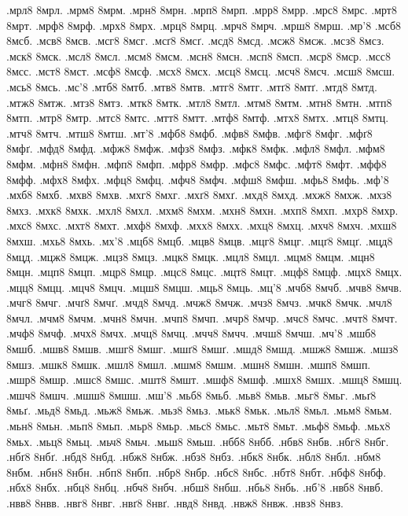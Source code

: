 {.мрл8
8мрл.
.мрм8
8мрм.
.мрн8
8мрн.
.мрп8
8мрп.
.мрр8
8мрр.
.мрс8
8мрс.
.мрт8
8мрт.
.мрф8
8мрф.
.мрх8
8мрх.
.мрц8
8мрц.
.мрч8
8мрч.
.мрш8
8мрш.
.мр'8
.мсб8
8мсб.
.мсв8
8мсв.
.мсг8
8мсг.
.мсґ8
8мсґ.
.мсд8
8мсд.
.мсж8
8мсж.
.мсз8
8мсз.
.мск8
8мск.
.мсл8
8мсл.
.мсм8
8мсм.
.мсн8
8мсн.
.мсп8
8мсп.
.мср8
8мср.
.мсс8
8мсс.
.мст8
8мст.
.мсф8
8мсф.
.мсх8
8мсх.
.мсц8
8мсц.
.мсч8
8мсч.
.мсш8
8мсш.
.мсь8
8мсь.
.мс'8
.мтб8
8мтб.
.мтв8
8мтв.
.мтг8
8мтг.
.мтґ8
8мтґ.
.мтд8
8мтд.
.мтж8
8мтж.
.мтз8
8мтз.
.мтк8
8мтк.
.мтл8
8мтл.
.мтм8
8мтм.
.мтн8
8мтн.
.мтп8
8мтп.
.мтр8
8мтр.
.мтс8
8мтс.
.мтт8
8мтт.
.мтф8
8мтф.
.мтх8
8мтх.
.мтц8
8мтц.
.мтч8
8мтч.
.мтш8
8мтш.
.мт'8
.мфб8
8мфб.
.мфв8
8мфв.
.мфг8
8мфг.
.мфґ8
8мфґ.
.мфд8
8мфд.
.мфж8
8мфж.
.мфз8
8мфз.
.мфк8
8мфк.
.мфл8
8мфл.
.мфм8
8мфм.
.мфн8
8мфн.
.мфп8
8мфп.
.мфр8
8мфр.
.мфс8
8мфс.
.мфт8
8мфт.
.мфф8
8мфф.
.мфх8
8мфх.
.мфц8
8мфц.
.мфч8
8мфч.
.мфш8
8мфш.
.мфь8
8мфь.
.мф'8
.мхб8
8мхб.
.мхв8
8мхв.
.мхг8
8мхг.
.мхґ8
8мхґ.
.мхд8
8мхд.
.мхж8
8мхж.
.мхз8
8мхз.
.мхк8
8мхк.
.мхл8
8мхл.
.мхм8
8мхм.
.мхн8
8мхн.
.мхп8
8мхп.
.мхр8
8мхр.
.мхс8
8мхс.
.мхт8
8мхт.
.мхф8
8мхф.
.мхх8
8мхх.
.мхц8
8мхц.
.мхч8
8мхч.
.мхш8
8мхш.
.мхь8
8мхь.
.мх'8
.мцб8
8мцб.
.мцв8
8мцв.
.мцг8
8мцг.
.мцґ8
8мцґ.
.мцд8
8мцд.
.мцж8
8мцж.
.мцз8
8мцз.
.мцк8
8мцк.
.мцл8
8мцл.
.мцм8
8мцм.
.мцн8
8мцн.
.мцп8
8мцп.
.мцр8
8мцр.
.мцс8
8мцс.
.мцт8
8мцт.
.мцф8
8мцф.
.мцх8
8мцх.
.мцц8
8мцц.
.мцч8
8мцч.
.мцш8
8мцш.
.мць8
8мць.
.мц'8
.мчб8
8мчб.
.мчв8
8мчв.
.мчг8
8мчг.
.мчґ8
8мчґ.
.мчд8
8мчд.
.мчж8
8мчж.
.мчз8
8мчз.
.мчк8
8мчк.
.мчл8
8мчл.
.мчм8
8мчм.
.мчн8
8мчн.
.мчп8
8мчп.
.мчр8
8мчр.
.мчс8
8мчс.
.мчт8
8мчт.
.мчф8
8мчф.
.мчх8
8мчх.
.мчц8
8мчц.
.мчч8
8мчч.
.мчш8
8мчш.
.мч'8
.мшб8
8мшб.
.мшв8
8мшв.
.мшг8
8мшг.
.мшґ8
8мшґ.
.мшд8
8мшд.
.мшж8
8мшж.
.мшз8
8мшз.
.мшк8
8мшк.
.мшл8
8мшл.
.мшм8
8мшм.
.мшн8
8мшн.
.мшп8
8мшп.
.мшр8
8мшр.
.мшс8
8мшс.
.мшт8
8мшт.
.мшф8
8мшф.
.мшх8
8мшх.
.мшц8
8мшц.
.мшч8
8мшч.
.мшш8
8мшш.
.мш'8
.мьб8
8мьб.
.мьв8
8мьв.
.мьг8
8мьг.
.мьґ8
8мьґ.
.мьд8
8мьд.
.мьж8
8мьж.
.мьз8
8мьз.
.мьк8
8мьк.
.мьл8
8мьл.
.мьм8
8мьм.
.мьн8
8мьн.
.мьп8
8мьп.
.мьр8
8мьр.
.мьс8
8мьс.
.мьт8
8мьт.
.мьф8
8мьф.
.мьх8
8мьх.
.мьц8
8мьц.
.мьч8
8мьч.
.мьш8
8мьш.
.нбб8
8нбб.
.нбв8
8нбв.
.нбг8
8нбг.
.нбґ8
8нбґ.
.нбд8
8нбд.
.нбж8
8нбж.
.нбз8
8нбз.
.нбк8
8нбк.
.нбл8
8нбл.
.нбм8
8нбм.
.нбн8
8нбн.
.нбп8
8нбп.
.нбр8
8нбр.
.нбс8
8нбс.
.нбт8
8нбт.
.нбф8
8нбф.
.нбх8
8нбх.
.нбц8
8нбц.
.нбч8
8нбч.
.нбш8
8нбш.
.нбь8
8нбь.
.нб'8
.нвб8
8нвб.
.нвв8
8нвв.
.нвг8
8нвг.
.нвґ8
8нвґ.
.нвд8
8нвд.
.нвж8
8нвж.
.нвз8
8нвз.
}
